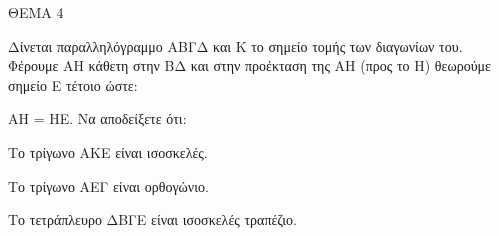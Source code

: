 
ΘΕΜΑ 4

Δίνεται παραλληλόγραμμο ΑΒΓΔ και Κ το σημείο τομής των διαγωνίων του. Φέρουμε ΑΗ κάθετη στην ΒΔ και στην προέκταση της ΑΗ (προς το Η) θεωρούμε σημείο Ε τέτοιο ώστε:

ΑΗ = ΗΕ. Να αποδείξετε ότι:

\begin{alist}
\item Το τρίγωνο ΑΚΕ είναι ισοσκελές. 

\item Το τρίγωνο ΑΕΓ είναι ορθογώνιο. 

\item Το τετράπλευρο ΔΒΓΕ είναι ισοσκελές τραπέζιο. 


\end{alist}
